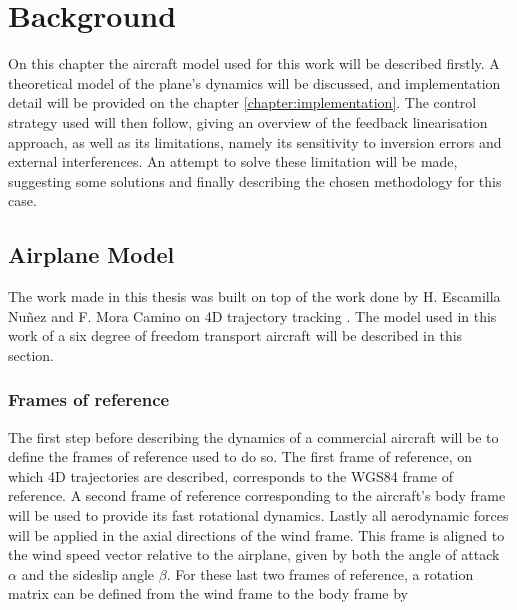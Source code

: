 
\chapter{Background}
\label{chapter:background}

On this chapter the aircraft model used for this work will be described firstly. A theoretical model of the plane's dynamics will be discussed, and implementation detail will be provided on the chapter \ref{chapter:implementation}. The control strategy used will then follow, giving an overview of the feedback linearisation approach, as well as its limitations, namely its sensitivity to inversion errors and external interferences. An attempt to solve these limitation will be made, suggesting some solutions and finally describing the chosen methodology for this case.



\section{Airplane Model}
\label{section:background/model}

The work made in this thesis was built on top of the work done by H. Escamilla Nuñez and  F. Mora Camino on 4D trajectory tracking \cite{hector}. The model used in this work of a six degree of freedom transport aircraft will be described in this section. 

\subsection{Frames of reference}
\label{section:background/model/for}
The first step before describing the dynamics of a commercial aircraft will be to define the frames of reference used to do so. The first frame of reference, on which 4D trajectories are described, corresponds to the WGS84 frame of reference. A second frame of reference corresponding to the aircraft's body frame will be used to provide its fast rotational dynamics. Lastly all aerodynamic forces will be applied in the axial directions of the wind frame. This frame is aligned to the wind speed vector relative to the airplane, given by both the angle of attack $\alpha$ and the sideslip angle $\beta$. For these last two frames of reference, a rotation matrix can be defined from the wind frame to the body frame by


